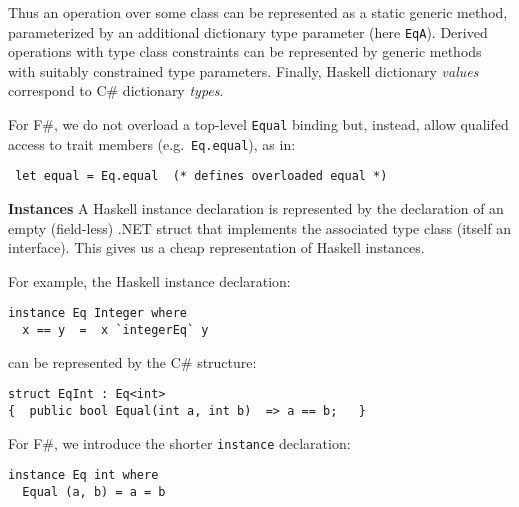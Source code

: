 \documentclass[9pt]{sig-alternate-05-2015}
\newif\ifclassic
\begin{document}
Thus an operation over some class can be represented as a static generic method, 
parameterized by an additional dictionary type parameter (here \lstinline{EqA}).
Derived operations with type class constraints can be represented by generic methods with suitably constrained type parameters.
Finally, Haskell dictionary \emph{values} correspond to  C\# dictionary \emph{types}.

For F\#, we do not overload a top-level \lstinline{Equal} binding but, instead, allow qualifed access to trait members (e.g.\ \lstinline{Eq.equal}), as in:
\begin{lstlisting}
 let equal = Eq.equal  (* defines overloaded equal *)
\end{lstlisting}




{\bf Instances}
A Haskell instance declaration is represented by the declaration of an empty (field-less) .NET  struct that implements the associated type class (itself an interface).
This gives us a cheap representation of Haskell instances. 

For example, the Haskell instance declaration:


{\small
\begin{lstlisting}
instance Eq Integer where 
  x == y  =  x `integerEq` y
\end{lstlisting}
}
can be represented by the C\# structure:
\begin{lstlisting}
struct EqInt : Eq<int>  
{  public bool Equal(int a, int b)  => a == b;   }
\end{lstlisting}

\ifclassic
For F\#, we introduce the shorter \lstinline{instance} declaration:

\begin{lstlisting}
instance Eq int where 
  Equal (a, b) = a = b
\end{lstlisting}
\end{document}
